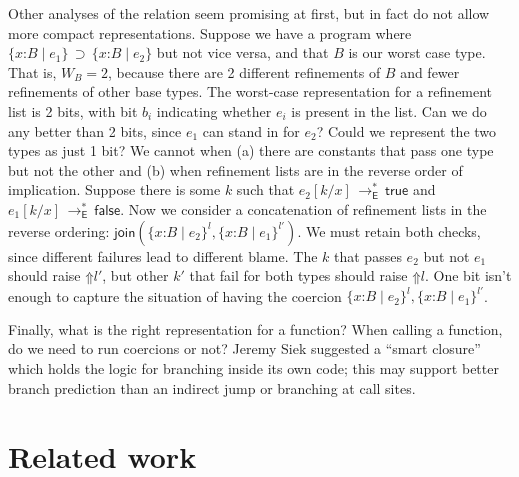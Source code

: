 \documentclass[9pt]{extarticle}
\newcommand{\ottnt}[1]{\mathit{#1}}
\newcommand{\ottmv}[1]{\mathit{#1}}
\begin{document}
Other analyses of the relation seem promising at first, but in fact do
not allow more compact representations.
Suppose we have a program where $ \{ \mathit{x} \mathord{:} \ottnt{B} \mathrel{\mid} \ottnt{e_{{\mathrm{1}}}} \}  \, \supset \,  \{ \mathit{x} \mathord{:} \ottnt{B} \mathrel{\mid} \ottnt{e_{{\mathrm{2}}}} \} $ but not
vice versa, and that $\ottnt{B}$ is our worst case type. That is, $W_{\ottnt{B}} =
2$, because there are 2 different refinements of $\ottnt{B}$ and fewer
refinements of other base types.
The worst-case representation for a refinement list is 2 bits, with
bit $b_i$ indicating whether $\ottnt{e_{\ottmv{i}}}$ is present in the list. Can we
do any better than 2 bits, since $\ottnt{e_{{\mathrm{1}}}}$ can stand in for $\ottnt{e_{{\mathrm{2}}}}$?
Could we represent the two types as just 1 bit?
We cannot when (a) there are constants that pass one type but not the
other and (b) when refinement lists are in the reverse order of
implication.
Suppose there is some $\ottnt{k}$ such that $ \ottnt{e_{{\mathrm{2}}}}  [  \ottnt{k} / \mathit{x}  ]  \,  \longrightarrow ^{*}_{  \mathsf{E}  }  \,  \mathsf{true} $ and
$ \ottnt{e_{{\mathrm{1}}}}  [  \ottnt{k} / \mathit{x}  ]  \,  \longrightarrow ^{*}_{  \mathsf{E}  }  \,  \mathsf{false} $. Now we consider a concatenation of
refinement lists in the reverse ordering: $ \mathsf{join} (  \{ \mathit{x} \mathord{:} \ottnt{B} \mathrel{\mid} \ottnt{e_{{\mathrm{2}}}} \}^{ \ottnt{l} }  ,  \{ \mathit{x} \mathord{:} \ottnt{B} \mathrel{\mid} \ottnt{e_{{\mathrm{1}}}} \}^{ \ottnt{l'} }  ) $. We must retain both checks, since different failures
lead to different blame. The $\ottnt{k}$ that passes $\ottnt{e_{{\mathrm{2}}}}$ but not
$\ottnt{e_{{\mathrm{1}}}}$ should raise $ \mathord{\Uparrow}  \ottnt{l'} $, but other $\ottnt{k'}$ that fail
for both types should raise $ \mathord{\Uparrow}  \ottnt{l} $. One bit isn't enough to
capture the situation of having the coercion
$  \{ \mathit{x} \mathord{:} \ottnt{B} \mathrel{\mid} \ottnt{e_{{\mathrm{2}}}} \}^{ \ottnt{l} }  ,  \{ \mathit{x} \mathord{:} \ottnt{B} \mathrel{\mid} \ottnt{e_{{\mathrm{1}}}} \}^{ \ottnt{l'} }  $.

Finally, what is the right representation for a function? When calling
a function, do we need to run coercions or not?
Jeremy Siek suggested a ``smart closure'' which holds the logic for
branching inside its own code; this may support better branch
prediction than an indirect jump or branching at call sites.

\section{Related work}
\label{sec:related}
\end{document}
